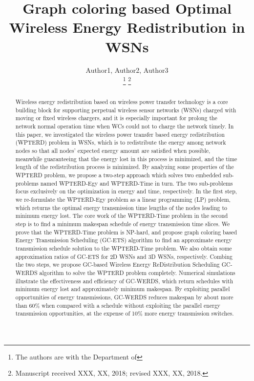 \documentclass[journal,10pt]{IEEEtran}
\begin{document}
\title{Graph coloring based Optimal Wireless Energy Redistribution in WSNs}


\author{Author1, Author2, Author3

\thanks{The authors are with the Department of }%
\thanks{Manuscript received XXX, XX, 2018; revised XXX, XX, 2018.}}

{}


\maketitle


\begin{abstract}
Wireless energy redistribution based on wireless power transfer technology is a core building block for supporting perpetual wireless sensor networks (WSNs) charged with moving or fixed wireless chargers, and it is especially important for prolong the network normal operation time when WCs could not to charge the network timely. In this paper, we investigated the wireless power transfer based energy redistribution (WPTERD) problem in WSNs, which is to redistribute the energy among network nodes so that all nodes' expected energy amount are satisfied when possible, meanwhile guaranteeing that the energy lost in this process is minimized, and the time length of the redistribution process is minimized. By analyzing some properties of the WPTERD problem, we propose a two-step approach which solves two embedded sub-problems named WPTERD-Egy and WPTERD-Time in turn. The two sub-problems focus exclusively on the optimization in energy and time, respectively. In the first step, we re-formulate the WPTERD-Egy problem as a linear programming (LP) problem, which returns the optimal energy transmission time lengths of the nodes leading to minimum energy lost. The core work of the WPTERD-Time problem in the second step is to find a minimum makespan schedule of energy transmission time slices. We prove that the WPTERD-Time problem is NP-hard, and propose graph coloring based Energy Transmission Scheduling (GC-ETS) algorithm to find an approximate energy transmission schedule solution to the WPTERD-Time problem. We also obtain some approximation ratios of GC-ETS for 2D WSNs and 3D WSNs, respectively. Combing the two steps, we propose GC-based Wireless Energy ReDistribution Scheduling GC-WERDS algorithm to solve the WPTERD problem completely. Numerical simulations illustrate the effectiveness and efficiency of GC-WERDS, which return schedules with minimum energy lost and approximately minimum makespan. By exploiting parallel opportunities of energy transmissions, GC-WERDS reduces makespan by about more than 60\% when compared with a schedule without exploiting the parallel energy transmission opportunities, at the expense of 10\% more energy transmission switches.
\end{abstract}
\end{document}
